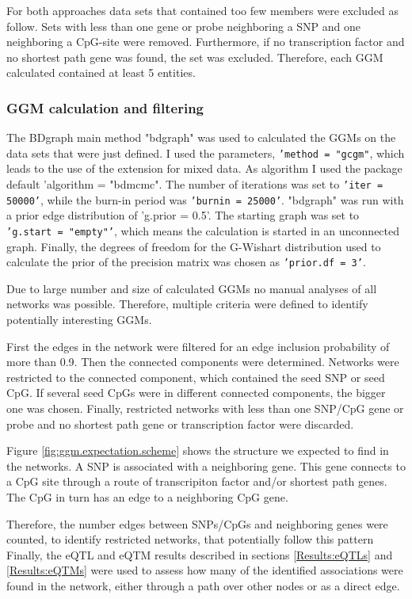 \documentclass[a4paper,12pt,twoside,openright]{article}
\begin{document}
For both approaches data sets that contained too few members were excluded as follow. Sets with less than one gene or probe neighboring a SNP and one neighboring a CpG-site were removed. Furthermore, if no transcription factor and no shortest path gene was found, the set was excluded. Therefore, each GGM calculated contained at least 5 entities.

\subsubsection{GGM calculation and filtering}
\label{Methods:GGM calculation and filtering}
The BDgraph main method "bdgraph" was used to calculated the GGMs on the data sets that were just defined. I used the parameters, \texttt{'method = "gcgm"}, which leads to the use of the extension for mixed data. As algorithm I used the package default 'algorithm = "bdmcmc". The number of iterations was set to \texttt{'iter = 50000'}, while the burn-in period was \texttt{'burnin = 25000'}. "bdgraph" was run with a prior edge distribution of 'g.prior = 0.5'. The starting graph was set to \texttt{'g.start = "empty"'}, which means the calculation is started in an unconnected graph. Finally, the degrees of freedom for the G-Wishart distribution used to calculate the prior of the precision matrix was chosen as \texttt{'prior.df = 3'}.

Due to large number and size of calculated GGMs no manual analyses of all networks was possible. Therefore, multiple criteria were defined to identify potentially interesting GGMs.

First the edges in the network were filtered for an edge inclusion probability of more than 0.9. Then the connected components were determined. Networks were restricted to the connected component, which contained the seed SNP or seed CpG. If several seed CpGs were in different connected components, the bigger one was chosen. Finally, restricted networks with less than one SNP/CpG gene or probe and no shortest path gene or transcription factor were discarded. 

Figure \ref{fig:ggm.expectation.scheme} shows the structure we expected to find in the networks. A SNP is associated with a neighboring gene. This gene connects to a CpG site through a route of transcripiton factor and/or shortest path genes. The CpG in turn has an edge to a neighboring CpG gene. 

Therefore, the number edges between SNPs/CpGs and neighboring genes were counted, to identify restricted networks, that potentially follow this pattern Finally, the eQTL and eQTM results described in sections \ref{Results:eQTLs} and \ref{Results:eQTMs} were used to assess how many of the identified associations were found in the network, either through a path over other nodes or as a direct edge. 
\end{document}

